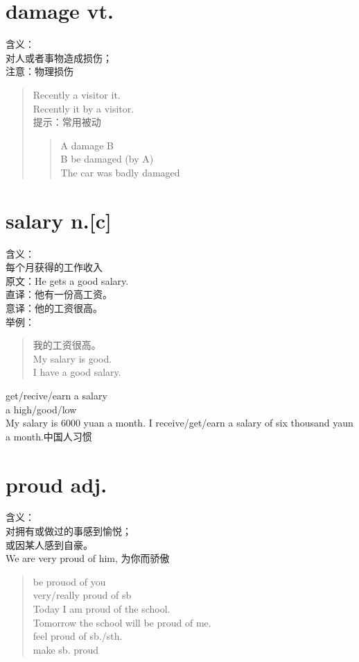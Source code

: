 \documentclass[twocolumn]{ctexbook}
\newcommand{\phrase}[1]{{\colorbox{yellow!40}{#1}}}
\newcommand{\point}[1]{{\color{red}#1}}
\newcommand{\word}[1]{{\em\color{black}{#1}}}
\newcommand{\sentence}[1]{{\colorbox[gray]{0.8}{#1}}}
\begin{document}
	\section{damage vt.}
	含义：\\
	对人或者事物造成损伤；\\
	注意：物理损伤\\
	\begin{quote}
		Recently a visitor \word{damaged} it.\\
		Recently it \word{was damaged} by a visitor.\\
		提示：常用\point{被动}\\
		\begin{quote}
			A \point{damage} B\\
			B \point{be damaged} (by A)\\
			\sentence{The car was badly damaged}\\
		\end{quote}
	\end{quote}
	\section{salary n.[c]}
	含义：\\
	每个月获得的工作收入\\
	原文：He gets a good salary.\\
	直译：他有一份高工资。\\
	意译：他的工资很高。\\
	举例：\begin{quote}
		我的工资很高。\\
		My salary is good.\\
		I have a good salary.\\
	\end{quote}
	\phrase{get/recive/earn a salary}\\
	\phrase{a high/good/low \word{salary}}\\
	\sentence{My salary is 6000 yuan a month.}
	\sentence{I receive/get/earn a salary of six thousand yaun a month.}\point{中国人习惯}
	\section{proud adj.}
	含义：\\
	对\point{拥有}或\point{做过的事}感到愉悦；\\
	或因\point{某人}感到自豪。\\
	\sentence{We are very proud of him,}
	为你而骄傲\begin{quote}
		be prouod of you \\
		very/really proud of sb\\
		Today I am proud of the school.\\
		Tomorrow the school will be proud of me.\\
		feel proud of sb./sth.\\
		make sb. proud\\
	\end{quote}
\end{document}
